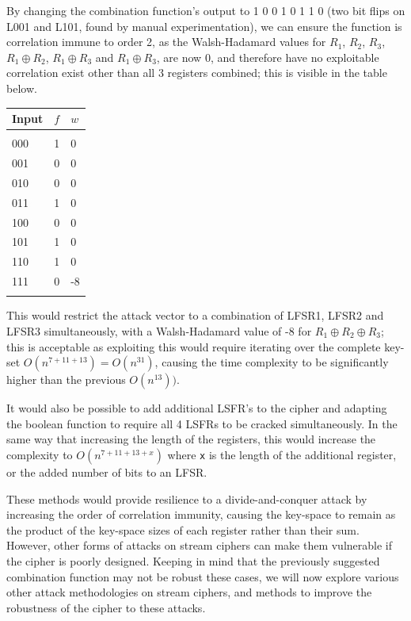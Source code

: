 \documentclass[british,11pt,a4paper]{article}
\begin{document}
By changing the combination function's output to 1 0 0 1 0 1 1 0 (two bit flips on L001 and L101, found by manual experimentation), we can ensure the function
is correlation immune to order 2, as the Walsh-Hadamard values for \(R_1\),
\(R_2\),  \(R_3\),  \(R_1 \oplus R_2\), \(R_1 \oplus R_3\) and \(R_1 \oplus R_3\), are now 0,
and therefore have no exploitable correlation exist other than all 3 registers combined; this is visible in the table below.

\begin{center}
	\begin{tabular}{@{}lll@{}}\label{tab:walsh2} \\
		Input & \(f\) & \(w\) \\
		\midrule \\
		000   & 1     & 0     \\
		001   & 0     & 0     \\
		010   & 0     & 0     \\
		011   & 1     & 0     \\
		100   & 0     & 0     \\
		101   & 1     & 0     \\
		110   & 1     & 0     \\
		111   & 0     & -8    \\
		\bottomrule \\
	\end{tabular}
\end{center}
This would restrict the attack vector to a combination of LFSR1, LFSR2 and LFSR3 simultaneously, with a Walsh-Hadamard value of -8 for \(R_1 \oplus R_2 \oplus R_3\); this is acceptable as exploiting
this would require iterating over the complete key-set \(O(n^{7+11+13}) = O(n^{31})\), causing the time complexity to be significantly higher than the previous \(O(n^{13}))\).

It would also be possible to add additional LSFR's to the cipher and adapting the boolean function to require all 4 LSFRs to be cracked simultaneously. In the same way that increasing the length of the registers, this would increase the complexity to \(O(n^{7+11+13+x})\) where \lstinline{x} is the length of the additional register, or the added number of bits to an LFSR.

These methods would provide resilience to a divide-and-conquer attack by increasing the order of correlation immunity, causing the key-space to remain as the product of the key-space sizes of each register rather than their sum. However, other forms of attacks on stream ciphers can make them vulnerable if the cipher is poorly designed. Keeping in mind that the previously suggested combination function may not be robust these cases, we will now explore various other attack methodologies on stream ciphers, and methods to improve the robustness of the cipher to these attacks.
\end{document}

